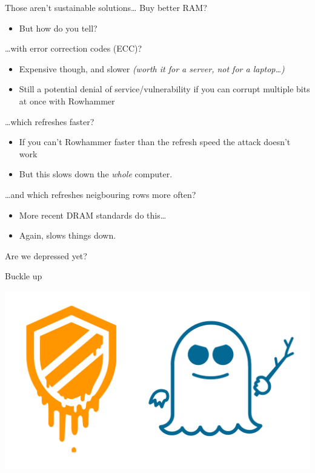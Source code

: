 \documentclass[9pt,aspectratio=169]{beamer}
\begin{document}
\begin{frame}[label={sec:orgb1521bd}]{Those aren't sustainable solutions\ldots{}}
Buy better RAM?
\begin{itemize}
\item But how do you tell?
\end{itemize}

\ldots{}with error correction codes (ECC)?
\begin{itemize}
\item Expensive though, and slower \emph{(worth it for a server, not for a laptop\ldots{})}
\item Still a potential denial of service/vulnerability if you can corrupt multiple bits at once with Rowhammer
\end{itemize}

\ldots{}which refreshes faster?
\begin{itemize}
\item If you can't Rowhammer faster than the refresh speed the attack doesn't work
\item But this slows down the \emph{whole} computer.
\end{itemize}

\ldots{}and which refreshes neigbouring rows more often?
\begin{itemize}
\item More recent DRAM standards do this\ldots{}
\item Again, slows things down.
\end{itemize}
\end{frame}

\begin{frame}[label={sec:org87ddda3}]{Are we depressed yet?}
\end{frame}

\begin{frame}[label={sec:orgd2de8e0}]{Buckle up}
\begin{center}
\includegraphics[width=.9\linewidth]{./brandnames.png}
\end{center}
\end{frame}
\end{document}
